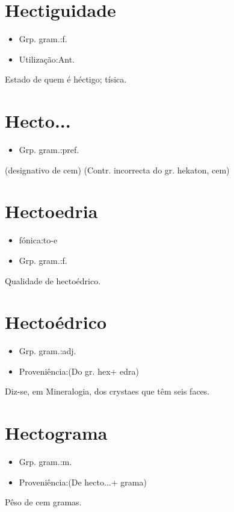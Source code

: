 \documentclass{article}
\begin{document}
\section{Hectiguidade}
\begin{itemize}
\item {Grp. gram.:f.}
\end{itemize}
\begin{itemize}
\item {Utilização:Ant.}
\end{itemize}
Estado de quem é héctigo; tísica.
\section{Hecto...}
\begin{itemize}
\item {Grp. gram.:pref.}
\end{itemize}
(designativo de \textunderscore cem\textunderscore )
(Contr. incorrecta do gr. \textunderscore hekaton\textunderscore , cem)
\section{Hectoedria}
\begin{itemize}
\item {fónica:to-e}
\end{itemize}
\begin{itemize}
\item {Grp. gram.:f.}
\end{itemize}
Qualidade de hectoédrico.
\section{Hectoédrico}
\begin{itemize}
\item {Grp. gram.:adj.}
\end{itemize}
\begin{itemize}
\item {Proveniência:(Do gr. \textunderscore hex\textunderscore  + \textunderscore edra\textunderscore )}
\end{itemize}
Diz-se, em Mineralogia, dos crystaes que têm seis faces.
\section{Hectograma}
\begin{itemize}
\item {Grp. gram.:m.}
\end{itemize}
\begin{itemize}
\item {Proveniência:(De \textunderscore hecto...\textunderscore  + \textunderscore grama\textunderscore )}
\end{itemize}
Pêso de cem gramas.
\end{document}
